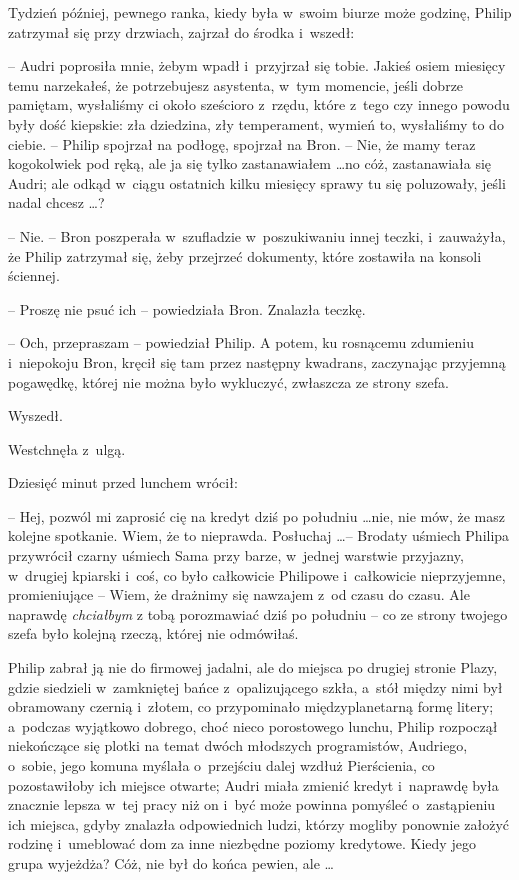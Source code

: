 \documentclass[oneside,polish,11pt,rmheadings]{mwbk}
\begin{document}
Tydzień później, pewnego ranka, kiedy była w~swoim biurze może godzinę, Philip zatrzymał się przy drzwiach, zajrzał do środka i~wszedł: 

-- Audri poprosiła mnie, żebym wpadł i~przyjrzał się tobie. Jakieś osiem miesięcy temu narzekałeś, że potrzebujesz asystenta, w~tym momencie, jeśli dobrze pamiętam, wysłaliśmy ci około sześcioro z~rzędu, które z~tego czy innego powodu były dość kiepskie: zła dziedzina, zły temperament, wymień to, wysłaliśmy to do ciebie. -- Philip spojrzał na podłogę, spojrzał na Bron. -- Nie, że mamy teraz kogokolwiek pod ręką, ale ja się tylko zastanawiałem \ldots  no cóż, zastanawiała się Audri; ale odkąd w~ciągu ostatnich kilku miesięcy sprawy tu się poluzowały, jeśli nadal chcesz \ldots ? 

-- Nie. -- Bron poszperała w~szufladzie w~poszukiwaniu innej teczki, i~zauważyła, że Philip zatrzymał się, żeby przejrzeć dokumenty, które zostawiła na konsoli ściennej.

-- Proszę nie psuć ich -- powiedziała Bron. Znalazła teczkę. 

-- Och, przepraszam -- powiedział Philip. A potem, ku rosnącemu zdumieniu i~niepokoju Bron, kręcił się tam przez następny kwadrans, zaczynając przyjemną pogawędkę, której nie można było wykluczyć, zwłaszcza ze strony szefa. 

Wyszedł. 

Westchnęła z~ulgą. 

Dziesięć minut przed lunchem wrócił: 

-- Hej, pozwól mi zaprosić cię na kredyt dziś po południu \ldots  nie, nie mów, że masz kolejne spotkanie. Wiem, że to nieprawda. Posłuchaj \ldots  -- Brodaty uśmiech Philipa przywrócił czarny uśmiech Sama przy barze, w~jednej warstwie przyjazny, w~drugiej kpiarski i~coś, co było całkowicie Philipowe i~całkowicie nieprzyjemne, promieniujące -- Wiem, że drażnimy się nawzajem z~od czasu do czasu. Ale naprawdę \textit{chciałbym }z tobą porozmawiać dziś po południu --  co ze strony twojego szefa było kolejną rzeczą, której nie odmówiłaś. 

Philip zabrał ją nie do firmowej jadalni, ale do miejsca po drugiej stronie Plazy, gdzie siedzieli w~zamkniętej bańce z~opalizującego szkła, a~stół między nimi był obramowany czernią i~złotem, co przypominało międzyplanetarną formę litery; a~podczas wyjątkowo dobrego, choć nieco porostowego lunchu, Philip rozpoczął niekończące się plotki na temat dwóch młodszych programistów, Audriego, o~sobie, jego komuna myślała o~przejściu dalej wzdłuż Pierścienia, co pozostawiłoby ich miejsce otwarte; Audri miała zmienić kredyt i~naprawdę była znacznie lepsza w~tej pracy niż on i~być może powinna pomyśleć o~zastąpieniu ich miejsca, gdyby znalazła odpowiednich ludzi, którzy mogliby ponownie założyć rodzinę i~umeblować dom za inne niezbędne poziomy kredytowe. Kiedy jego grupa wyjeżdża? Cóż, nie był do końca pewien, ale  \ldots  
\end{document}
